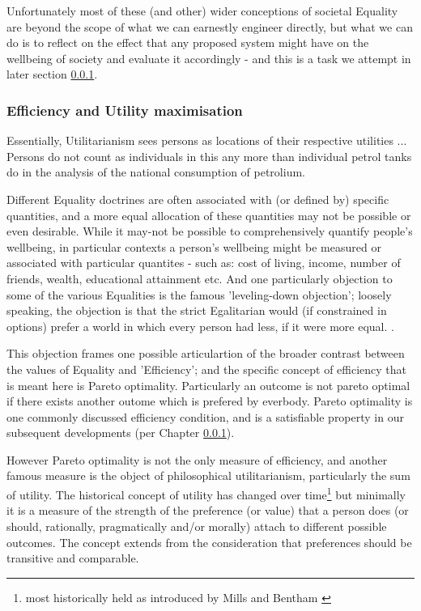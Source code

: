 Unfortunately most of these (and other) wider conceptions of societal Equality are beyond the scope of what we can earnestly engineer directly, but what we can do is to reflect on the effect that any proposed system might have on the wellbeing of society and evaluate it accordingly - and this is a task we attempt in later section \ref{}.

\subsubsection{Efficiency and Utility maximisation}

\begin{displayquote}
Essentially, Utilitarianism sees persons as locations of their respective utilities %
 ... Persons do not count as individuals in this any more than individual petrol tanks do in the analysis of the national consumption of petrolium.
\cite{}
\end{displayquote}

Different Equality doctrines are often associated with (or defined by) specific quantities, and a more equal allocation of these quantities may not be possible or even desirable.
While it may-not be possible to comprehensively quantify people's wellbeing, in particular contexts a person's wellbeing might be measured or associated with particular quantites - such as: cost of living, income, number of friends, wealth, educational attainment etc.
And one particularly objection to some of the various Equalities is the famous 'leveling-down objection'; loosely speaking, the objection is that the strict Egalitarian would (if constrained in options) prefer a world in which every person had less, if it were more equal. \cite{temkin_2003, equalityandpriorityparfit}.

This objection frames one possible articulartion of the broader contrast between the values of Equality and 'Efficiency'; and the specific concept of efficiency that is meant here is Pareto optimality.
Particularly an outcome is not pareto optimal if there exists another outome which is prefered by everbody.
Pareto optimality is one commonly discussed efficiency condition, and is a satisfiable property in our subsequent developments (per Chapter \ref{}).

However Pareto optimality is not the only measure of efficiency, and another famous measure is the object of philosophical utilitarianism, particularly the sum of utility.
The historical concept of utility has changed over time\footnote{most historically held as introduced by Mills and Bentham\cite{} \cite{}} but minimally it is a measure of the strength of the preference (or value) that a person does (or should, rationally, pragmatically and/or morally) attach to different possible outcomes.
The concept extends from the consideration that preferences should be transitive and comparable.

